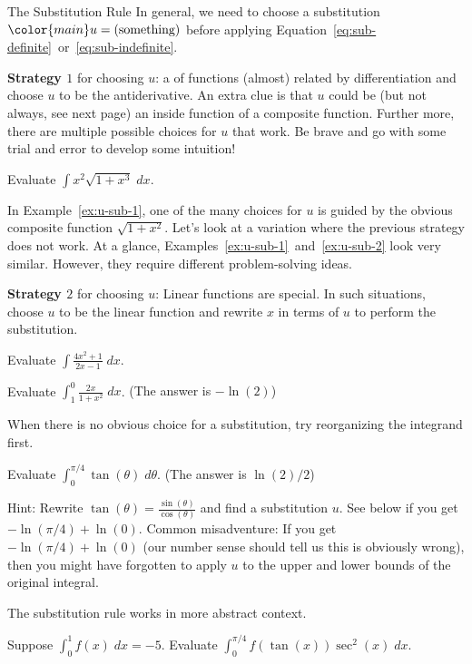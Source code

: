 \documentclass[../main.tex]{subfiles}
\begin{document}
\begin{lesson}{The Substitution Rule}
  In general, we need to choose a substitution \(\color{main} u = (\text{something})\) before applying Equation~\eqref{eq:sub-definite}~or~\eqref{eq:sub-indefinite}.

  \textbf{Strategy \(1\)} for choosing \(u\):  a  of functions (almost) related by differentiation and choose \(u\) to be the antiderivative.  An extra clue is that \(u\) could be (but not always, see next page) an inside function of a composite function. Further more, there are multiple possible choices for \(u\) that work. Be brave and go with some trial and error to develop some intuition!
  \begin{example} \label{ex:u-sub-1}
    Evaluate \(\int x^{2} \sqrt{1 + x^{3}} \;dx\).
  \end{example}
  \clearpage

  In Example~\ref{ex:u-sub-1}, one of the many choices for \(u\) is guided by the obvious composite function \(\sqrt{1 + x^{2}}\). Let's look at a variation where the previous strategy does not work. At a glance, Examples~\ref{ex:u-sub-1}~and~\ref{ex:u-sub-2} look very similar. However, they require different problem-solving ideas.

  \textbf{Strategy \(2\)} for choosing \(u\): Linear functions are special. In such situations, choose \(u\) to be the linear function and rewrite \(x\) in terms of \(u\) to perform the substitution.
  \begin{example} \label{ex:u-sub-2}
    Evaluate \(\int \frac{4x^{2} + 1}{2x - 1} \;dx\).
  \end{example}

  \begin{example}
    Evaluate \(\int_{1}^{0} \frac{2x}{1 + x^{2}} \;dx\). \hfill{}{(The answer is \(-\ln(2)\))}
  \end{example}

  \clearpage
  When there is no obvious choice for a substitution, try reorganizing the integrand first.
  \begin{example}
    Evaluate \(\int_{0}^{\pi/4} \tan(\theta) \;d\theta\). \hfill{}{(The answer is \(\ln(2)/2\))}

    Hint: Rewrite \(\tan(\theta) = \frac{\sin(\theta)}{\cos(\theta)}\) and find a substitution \(u\). See below if you get \(-\ln(\pi/4) + \ln(0)\).
    Common misadventure: If you get \(-\ln(\pi/4) + \ln(0)\) (our number sense should tell us this is obviously wrong), then you might have forgotten to apply \(u\) to the upper and lower bounds of the original integral.
  \end{example}

  \medskip
  The substitution rule works in more abstract context.
  \begin{example}
    Suppose \(\int_{0}^{1} f(x) \;dx = -5\). Evaluate \(\int_{0}^{\pi/4} f(\tan(x)) \sec^{2}(x) \;dx\).
  \end{example}
\end{lesson}
\end{document}
